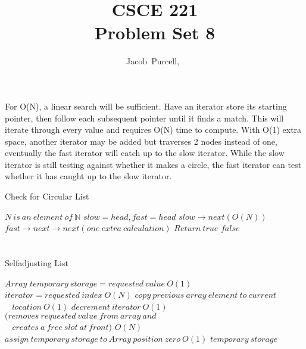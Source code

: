\documentclass[journal]{IEEEtran}
\begin{document}
\title{CSCE 221 \\ Problem Set 8}

\author{Jacob~Purcell,~}

\maketitle
\section{}
For O(N), a linear search will be sufficient. Have an iterator store its starting pointer, 
then follow each subsequent pointer until it finds a match. This will iterate through every 
value and requires O(N) time to compute. With O(1) extra space, another iterator may be added but 
traverses 2 nodes instead of one, eventually the fast iterator will catch up to the slow iterator. 
While the slow iterator is still testing against whether it makes a circle, the fast iterator can 
test whether it has caught up to the slow iterator. 

\begin{algorithm}
\caption{Check for Circular List}
\begin{algorithmic}
	\REQUIRE $N~is~an~element~of~\mathbb{N}$
	\STATE $slow = head, fast = head$
	\STATE $slow \rightarrow next(O(N))$
	\STATE $fast \rightarrow next \rightarrow next (one~extra~calculation)$
	\STATE $Return~true$
	\ENDIF
	\ENDWHILE
	\RETURN $false$
\end{algorithmic}
\end{algorithm}


\section{}
\subsection{}
\begin{algorithm}
\caption{Selfadjusting List}
\begin{algorithmic}
	\REQUIRE $Array$
	\STATE $temporary~storage = requested~value~O(1)$
	\STATE $iterator = requested~index~O(N)$
	\STATE $copy~previous~array~element~to~current$
	\STATE $~~~~location~O(1)$
	\STATE $decrement~iterator~O(1)$ 
	\STATE $(removes~requested~value~from~array~and~$ \\ $~~~~creates~a~free~slot~at~front)$
	\ENDWHILE $O(N)$
	\STATE $assign~temporary~storage~to~Array~position~zero~O(1)$
	\RETURN $temporary~storage$
\end{algorithmic}
\end{algorithm}
\end{document}
